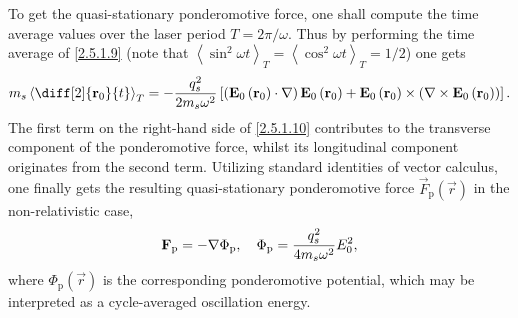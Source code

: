 To get the quasi-stationary ponderomotive force, one shall compute the time average values over the laser period $ T = 2 \pi/ \omega $. Thus by performing the time average of \ref{2.5.1.9} (note that $ \left\langle \sin^2 \omega t \right\rangle_T = \left\langle \cos^2 \omega t \right\rangle_T = 1/2$) one gets
\begin{equation}
\label{2.5.1.10}
m_s \left\langle \diff[2]{\vec{r}_0}{t} \right\rangle_{T} = - \frac{q_s^{2}}{2 m_s \omega^2} \left[\left(\vec{E}_0 \left(\vec{r}_0 \right) \cdot \nabla \right) \vec{E}_0 \left(\vec{r}_0 \right) + \vec{E}_0 \left(\vec{r}_0 \right) \times \left( \nabla \times \vec{E}_0 \left(\vec{r}_0 \right) \right)\right].
\end{equation}
The first term on the right-hand side of \ref{2.5.1.10} contributes to the transverse component of the ponderomotive force, whilst its longitudinal component originates from the second term. Utilizing standard identities of vector calculus, one finally gets the resulting quasi-stationary ponderomotive force $ \vec{F}_{\mathrm{p}} \left( \vec{r} \right) $ in the non-relativistic case,
\begin{equation}
\label{2.5.1.11}
\mathbf{F}_{\mathrm{p}} = - \nabla \Phi_{\mathrm{p}}, \quad \Phi_{\mathrm{p}} = \frac{q_s^{2}}{4 m_s \omega^2} E_0^{2},
\end{equation}
where $ \Phi_{\mathrm{p}} \left( \vec{r} \right) $ is the corresponding ponderomotive potential, which may be interpreted as a cycle-averaged oscillation energy.

